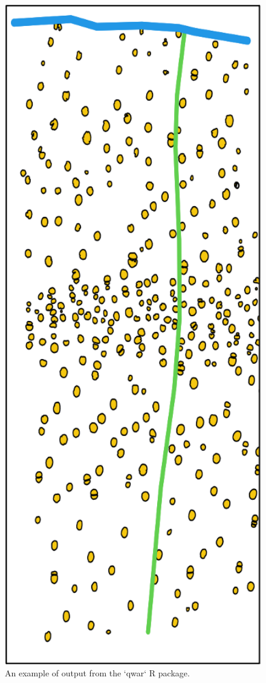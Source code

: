 \documentclass[
]{book}
\begin{document}
\begin{figure}

{\centering \includegraphics[width=5.24in,height=0.2\textheight]{images/Methods/r/vessels} 

}

\caption{An example of output from the `qwar` R package.}\label{fig:unnamed-chunk-6}
\end{figure}
\end{document}
